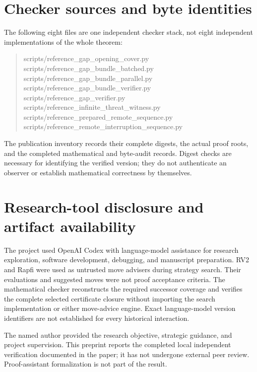 \documentclass[11pt]{article}
\theoremstyle{definition}
\theoremstyle{remark}
\begin{document}
\section{Checker sources and byte identities}
\label{app:sources}
The following eight files are one independent checker stack, not eight
independent implementations of the whole theorem:
\begin{quote}\small\ttfamily
scripts/reference\_gap\_opening\_cover.py\\
scripts/reference\_gap\_bundle\_batched.py\\
scripts/reference\_gap\_bundle\_parallel.py\\
scripts/reference\_gap\_bundle\_verifier.py\\
scripts/reference\_gap\_verifier.py\\
scripts/reference\_infinite\_threat\_witness.py\\
scripts/reference\_prepared\_remote\_sequence.py\\
scripts/reference\_remote\_interruption\_sequence.py
\end{quote}
The publication inventory records their complete digests, the actual proof
roots, and the completed mathematical and byte-audit records. Digest checks
are necessary for identifying the verified version; they do not authenticate
an observer or establish mathematical correctness by themselves.

\section{Research-tool disclosure and artifact availability}
The project used OpenAI Codex with language-model assistance for research
exploration, software development, debugging, and manuscript preparation.
RV2 and Rapfi were used as untrusted move advisers during strategy search.
Their evaluations and suggested moves were not proof acceptance criteria.
The mathematical checker reconstructs the required successor coverage and
verifies the complete selected certificate closure without importing the
search implementation or either move-advice engine. Exact language-model
version identifiers are not established for every historical interaction.

The named author provided the research objective, strategic guidance, and
project supervision. This preprint reports the completed local independent
verification documented in the paper; it has not undergone external peer
review. Proof-assistant formalization is not part of the result.
\end{document}
